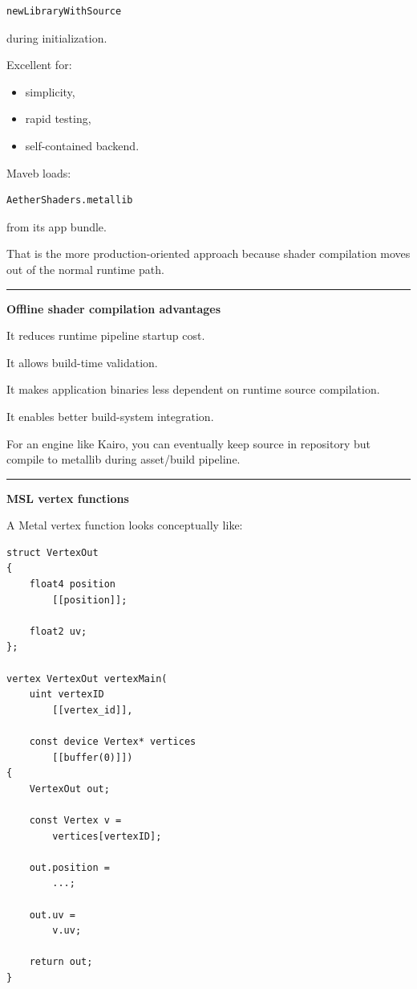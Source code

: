 \begin{verbatim}
newLibraryWithSource
\end{verbatim}

during initialization.

Excellent for:

\begin{itemize}
\tightlist
\item
  simplicity,
\item
  rapid testing,
\item
  self-contained backend.
\end{itemize}

Maveb loads:

\begin{verbatim}
AetherShaders.metallib
\end{verbatim}

from its app bundle.

That is the more production-oriented approach because shader compilation moves out of the normal runtime path.

\begin{center}\rule{0.5\linewidth}{0.5pt}\end{center}

\textbf{Offline shader compilation advantages}

It reduces runtime pipeline startup cost.

It allows build-time validation.

It makes application binaries less dependent on runtime source compilation.

It enables better build-system integration.

For an engine like Kairo, you can eventually keep source in repository but compile to metallib during asset/build pipeline.

\begin{center}\rule{0.5\linewidth}{0.5pt}\end{center}

\textbf{MSL vertex functions}

A Metal vertex function looks conceptually like:

\begin{verbatim}
struct VertexOut
{
    float4 position
        [[position]];

    float2 uv;
};

vertex VertexOut vertexMain(
    uint vertexID
        [[vertex_id]],

    const device Vertex* vertices
        [[buffer(0)]])
{
    VertexOut out;

    const Vertex v =
        vertices[vertexID];

    out.position =
        ...;

    out.uv =
        v.uv;

    return out;
}
\end{verbatim}

